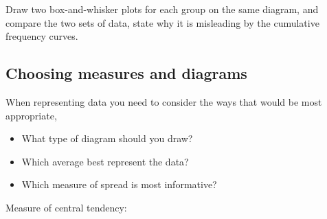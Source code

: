 \begin{enumerate}
 
 \medskip
 
 
 Draw two box-and-whisker plots for each group on the same diagram, and compare the two sets of data, state why it is misleading by the cumulative frequency curves.
 
 
	
\end{enumerate}

\newpage 

\subsection{Choosing measures and diagrams}
When representing data  you need to  consider the ways that would be most  appropriate,

\begin{itemize}
\setlength\itemsep{1.8em}
	\item What type of diagram should you draw?
	\item  Which average best represent the data?
	\item Which measure of spread is most informative?
\end{itemize}

\vspace{2cm}
Measure of central tendency:

